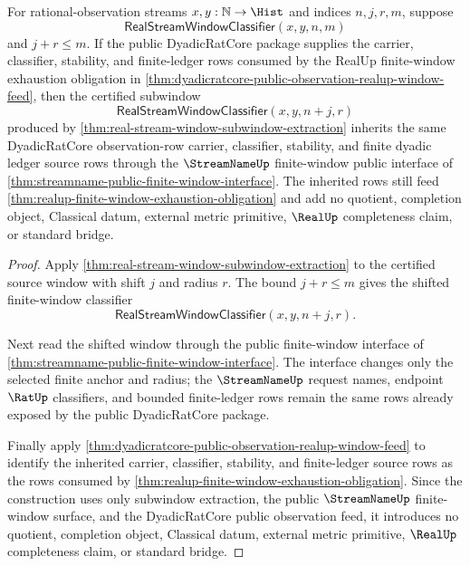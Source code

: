 \begin{theorem}
\label{thm:dyadicratcore-public-observation-subwindow-stability}
For rational-observation streams $x,y:\mathbb{N}\to\Hist$ and indices
$n,j,r,m$, suppose
$$
\mathsf{RealStreamWindowClassifier}(x,y,n,m)
$$
and $j+r\le m$. If the public DyadicRatCore package supplies the carrier,
classifier, stability, and finite-ledger rows consumed by the RealUp
finite-window exhaustion obligation in
\autoref{thm:dyadicratcore-public-observation-realup-window-feed}, then the
certified subwindow
$$
\mathsf{RealStreamWindowClassifier}(x,y,n+j,r)
$$
produced by
\autoref{thm:real-stream-window-subwindow-extraction} inherits the same
DyadicRatCore observation-row carrier, classifier, stability, and finite dyadic
ledger source rows through the $\StreamNameUp$ finite-window public interface of
\autoref{thm:streamname-public-finite-window-interface}. The inherited rows
still feed \autoref{thm:realup-finite-window-exhaustion-obligation} and add no
quotient, completion object, Classical datum, external metric primitive,
$\RealUp$ completeness claim, or standard bridge.
\end{theorem}
\begin{proof}
Apply \autoref{thm:real-stream-window-subwindow-extraction} to the certified
source window with shift $j$ and radius $r$. The bound $j+r\le m$ gives the
shifted finite-window classifier
$$
\mathsf{RealStreamWindowClassifier}(x,y,n+j,r).
$$

Next read the shifted window through the public finite-window interface of
\autoref{thm:streamname-public-finite-window-interface}. The interface changes
only the selected finite anchor and radius; the $\StreamNameUp$ request names,
endpoint $\RatUp$ classifiers, and bounded finite-ledger rows remain the same
rows already exposed by the public DyadicRatCore package.

Finally apply
\autoref{thm:dyadicratcore-public-observation-realup-window-feed} to identify
the inherited carrier, classifier, stability, and finite-ledger source rows as
the rows consumed by
\autoref{thm:realup-finite-window-exhaustion-obligation}. Since the construction
uses only subwindow extraction, the public $\StreamNameUp$ finite-window
surface, and the DyadicRatCore public observation feed, it introduces no
quotient, completion object, Classical datum, external metric primitive,
$\RealUp$ completeness claim, or standard bridge.
\end{proof}

